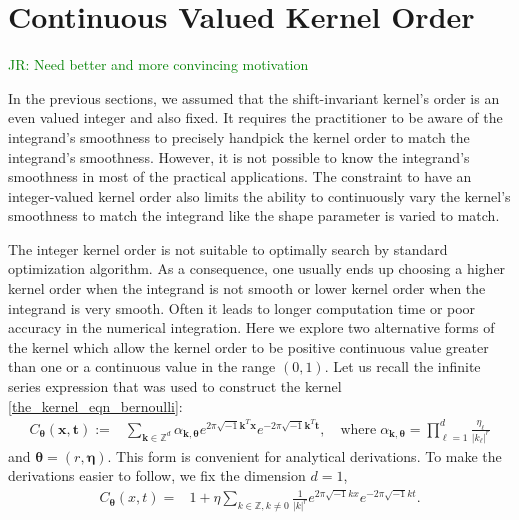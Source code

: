 \documentclass{svjour3}                     %
\newcommand{\bm}[1]{\boldsymbol{#1}}
\newcommand{\veta}{{\bm{\eta}}}
\newcommand{\vtheta}{{\bm{\theta}}}
\newcommand{\vk}{\bm{k}}
\newcommand{\vt}{\bm{t}}
\newcommand{\vx}{\bm{x}}
\def\abs#1{\ensuremath{\left \lvert #1 \right \rvert}}
\newcommand{\JRNote}[1]{{\textcolor{green}{JR: #1}}}
\begin{document}
\section{Continuous Valued Kernel Order}
\label{sec:non_integer_kernel_order}

\JRNote{Need better and more convincing motivation}

In the previous sections, we assumed that the shift-invariant kernel's order is an even valued integer and also fixed. It requires the practitioner to be aware of the integrand's smoothness to precisely handpick the kernel order to match the integrand's smoothness. However, it is not possible to know the integrand's smoothness in most of the practical applications. The constraint to have an integer-valued kernel order also limits the ability to continuously vary the kernel's smoothness to match the integrand like the shape parameter is varied to match. 

The integer kernel order is not suitable to optimally search by standard optimization algorithm.
As a consequence, one usually ends up choosing a higher kernel order when the integrand is not  smooth or lower kernel order when the integrand is very smooth.
Often it leads to longer computation time or poor accuracy in the numerical integration.
Here we explore two alternative forms of the kernel which allow the kernel order to be positive continuous value greater than one or a continuous value in the range $(0,1)$. Let us recall the infinite series expression that was used to construct the kernel \eqref{the_kernel_eqn_bernoulli}:
\begin{align*}
C_\vtheta(\vx, \vt) := &  \sum_{\vk \in \mathbb{Z}^d} \alpha_{\vk,\vtheta}  e^{2 \pi\sqrt{-1} \vk^T\vx}
e^{-2 \pi\sqrt{-1} \vk^T\vt}, \quad \text{where} \; 
\alpha_{\vk,\vtheta} = \prod_{\ell=1}^d \frac{\eta_\ell}{{|k_\ell|}^r} 
\end{align*}
and $\vtheta = (r, \veta)$.  This form is convenient for analytical derivations.
To make the derivations easier to follow, we fix the dimension $d=1$,
\begin{align*}
C_\vtheta(x, t) = & 1 + \eta \sum_{k \in \mathbb{Z}, k \neq 0 } \frac{1}{\abs{k}^r} 
e^{ 2 \pi\sqrt{-1} k x}
e^{-2 \pi\sqrt{-1} k t}.
\end{align*}
\end{document}
